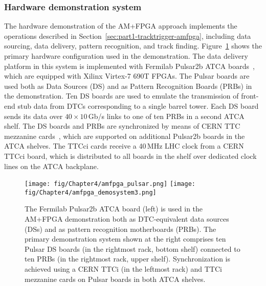 \subsubsection{Hardware demonstration system}
\label{sec:Part2_Chapter4_TrackTrigger-AM_demosystem}
The hardware demonstration of the AM+FPGA approach implements the operations described in Section~\ref{sec:part1-tracktrigger-amfpga}, including data sourcing, data delivery, pattern recognition, and track finding. Figure~\ref{fig:amfpga_demosystem} shows the primary hardware configuration used in the demonstration. The data delivery platform in this system is implemented with Fermilab Pulsar2b ATCA boards~\cite{Olsen:2013cpa, PulsarMemo}, which are equipped with Xilinx Virtex-7 690T FPGAs. The Pulsar boards are used both as Data Sources (DS) and as Pattern Recognition Boards (PRBs) in the demonstration. Ten DS boards are used to emulate the transmission of front-end stub data from DTCs corresponding to a single barrel tower. Each DS board sends its data over $40\times 10$\,Gb/s links to one of ten PRBs in a second ATCA shelf. The DS boards and PRBs are synchronized by means of CERN TTC mezzanine cards~\cite{TTC}, which are supported on additional Pulsar2b boards in the ATCA shelves. The TTCci cards receive a 40\,MHz LHC clock from a CERN TTCci board, which is distributed to all boards in the shelf over dedicated clock lines on the ATCA backplane. 

\begin{figure}[t]
  \centering
\texttt{[image: fig/Chapter4/amfpga\_pulsar.png]}
\hfill
\texttt{[image: fig/Chapter4/amfpga\_demosystem3.png]}
  \caption{The Fermilab Pulsar2b ATCA board (left) is used in the AM+FPGA demonstration both as DTC-equivalent data sources (DSs) and as pattern recognition motherboards (PRBs). The primary demonstration system shown at the right comprises ten Pulsar DS boards (in the rightmost rack, bottom shelf) connected to ten PRBs (in the rightmost rack, upper shelf). Synchronization is achieved using a CERN TTCi (in the leftmost rack) and TTCi mezzanine cards on Pulsar boards in both ATCA shelves.} 
  \label{fig:amfpga_demosystem}
\end{figure}

